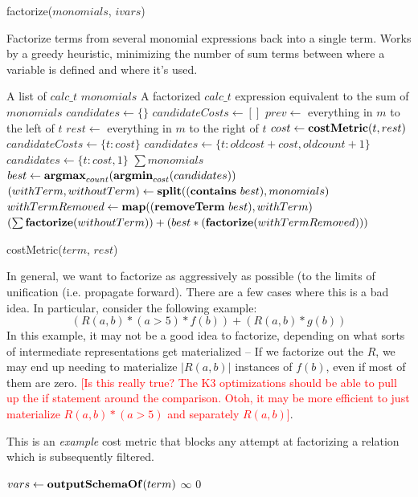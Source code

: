 \documentclass[11pt]{amsart}
\newcommand{\todo}[1]{\textcolor{red}{[#1]}}
\begin{document}
\begin{algorithm}
\caption{factorize($monomials$, $ivars$)}
Factorize terms from several monomial expressions back into a single term.
Works by a greedy heuristic, minimizing the number of sum terms between where a variable is defined and where it's used. 
\begin{algorithmic}[1]
\REQUIRE A list of $calc\_t$ $monomials$
\ENSURE A factorized $calc\_t$ expression equivalent to the sum of $monomials$
\STATE $candidates \gets \{\}$
  \STATE $candidateCosts \gets []$
    \STATE $prev \gets $ everything in $m$ to the left of $t$
    \STATE $rest \gets $ everything in $m$ to the right of $t$    
      \STATE $cost \gets {\bf costMetric}(t, rest)$
        \STATE $candidateCosts \gets \{t:cost\}$
      \ENDIF
    \ENDIF
  \ENDFOR
      \STATE $candidates \gets \{t:oldcost+cost, oldcount+1\}$
    \ELSE
      \STATE $candidates \gets \{t:cost, 1\}$
    \ENDIF
  \ENDFOR
\ENDFOR
{}
  \RETURN $\sum monomials$
\ELSE
  \STATE $best \gets {\bf argmax}_{count}({\bf argmin}_{cost}(candidates))$
  \STATE $(withTerm,withoutTerm) \gets {\bf split}(({\bf contains}\ best),monomials)$
  \STATE $withTermRemoved \gets {\bf map}(({\bf removeTerm}\ best), withTerm)$
  \RETURN $(\sum {\bf factorize}(withoutTerm)) + (best * ({\bf factorize}(withTermRemoved)))$
\ENDIF
\end{algorithmic}
\end{algorithm}

\begin{algorithm}
\caption{costMetric($term$, $rest$)}
In general, we want to factorize as aggressively as possible (to the limits of unification (i.e. propagate forward).  There are a few cases where this is a bad idea.  In particular, consider the following example:
$$(R(a,b) * (a > 5) * f(b)) + (R(a,b) * g(b))$$
In this example, it may not be a good idea to factorize, depending on what sorts of intermediate representations get materialized -- If we factorize out the $R$, we may end up needing to materialize $|R(a,b)|$ instances of $f(b)$, even if most of them are zero.  \todo{Is this really true?  The K3 optimizations should be able to pull up the if statement around the comparison.  Otoh, it may be more efficient to just materialize $R(a,b)*(a > 5)$ and separately $R(a,b)$}. 

This is an {\em example} cost metric that blocks any attempt at factorizing a relation which is subsequently filtered.
\begin{algorithmic}
\STATE $vars \gets {\bf outputSchemaOf}(term)$
      \RETURN $\infty$
    \ENDIF
  \ENDIF
\ENDFOR
\RETURN $0$
\end{algorithmic}
\end{algorithm}
\end{document}

